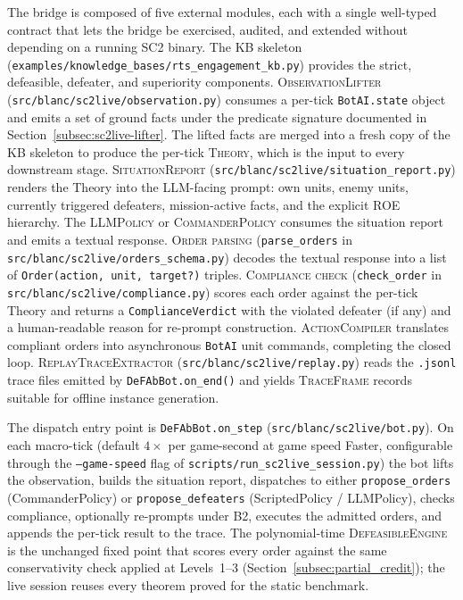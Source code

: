 \documentclass{article}
\theoremstyle{definition}
\begin{document}
The bridge is composed of five external modules, each with a single well-typed contract that lets the bridge be exercised, audited, and extended without depending on a running SC2 binary. The KB skeleton (\texttt{examples/knowledge\_bases/rts\_engagement\_kb.py}) provides the strict, defeasible, defeater, and superiority components. \textsc{ObservationLifter} (\texttt{src/blanc/sc2live/observation.py}) consumes a per-tick \texttt{BotAI.state} object and emits a set of ground facts under the predicate signature documented in Section~\ref{subsec:sc2live-lifter}. The lifted facts are merged into a fresh copy of the KB skeleton to produce the per-tick \textsc{Theory}, which is the input to every downstream stage. \textsc{SituationReport} (\texttt{src/blanc/sc2live/situation\_report.py}) renders the Theory into the LLM-facing prompt: own units, enemy units, currently triggered defeaters, mission-active facts, and the explicit ROE hierarchy. The \textsc{LLMPolicy} or \textsc{CommanderPolicy} consumes the situation report and emits a textual response. \textsc{Order parsing} (\texttt{parse\_orders} in \texttt{src/blanc/sc2live/orders\_schema.py}) decodes the textual response into a list of \texttt{Order(action, unit, target?)} triples. \textsc{Compliance check} (\texttt{check\_order} in \texttt{src/blanc/sc2live/compliance.py}) scores each order against the per-tick Theory and returns a \texttt{ComplianceVerdict} with the violated defeater (if any) and a human-readable reason for re-prompt construction. \textsc{ActionCompiler} translates compliant orders into asynchronous \texttt{BotAI} unit commands, completing the closed loop. \textsc{ReplayTraceExtractor} (\texttt{src/blanc/sc2live/replay.py}) reads the \texttt{.jsonl} trace files emitted by \texttt{DeFAbBot.on\_end()} and yields \textsc{TraceFrame} records suitable for offline instance generation.

The dispatch entry point is \texttt{DeFAbBot.on\_step} (\texttt{src/blanc/sc2live/bot.py}). On each macro-tick (default $4 \times$ per game-second at game speed Faster, configurable through the \texttt{--game-speed} flag of \texttt{scripts/run\_sc2live\_session.py}) the bot lifts the observation, builds the situation report, dispatches to either \texttt{propose\_orders} (CommanderPolicy) or \texttt{propose\_defeaters} (ScriptedPolicy / LLMPolicy), checks compliance, optionally re-prompts under B2, executes the admitted orders, and appends the per-tick result to the trace. The polynomial-time \textsc{DefeasibleEngine} is the unchanged fixed point that scores every order against the same conservativity check applied at Levels~1--3 (Section~\ref{subsec:partial_credit}); the live session reuses every theorem proved for the static benchmark.
\end{document}
